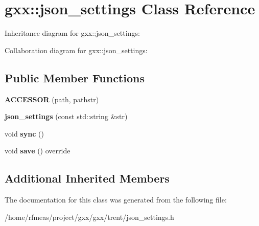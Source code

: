 \hypertarget{classgxx_1_1json__settings}{}\section{gxx\+:\+:json\+\_\+settings Class Reference}
\label{classgxx_1_1json__settings}


Inheritance diagram for gxx\+:\+:json\+\_\+settings\+:


Collaboration diagram for gxx\+:\+:json\+\_\+settings\+:
\subsection*{Public Member Functions}
\begin{DoxyCompactItemize}
\item 
{\bfseries A\+C\+C\+E\+S\+S\+OR} (path, pathstr)\hypertarget{classgxx_1_1json__settings_a6185e6ffd28a9571a7ebbb6b1ebb414d}{}\label{classgxx_1_1json__settings_a6185e6ffd28a9571a7ebbb6b1ebb414d}

\item 
{\bfseries json\+\_\+settings} (const std\+::string \&str)\hypertarget{classgxx_1_1json__settings_a81102ad9328f3b7b81cc634af1f8f44a}{}\label{classgxx_1_1json__settings_a81102ad9328f3b7b81cc634af1f8f44a}

\item 
void {\bfseries sync} ()\hypertarget{classgxx_1_1json__settings_ae5f77725abf4eba9ef8fa099b03c1c6a}{}\label{classgxx_1_1json__settings_ae5f77725abf4eba9ef8fa099b03c1c6a}

\item 
void {\bfseries save} () override\hypertarget{classgxx_1_1json__settings_a14f1136137ea11018fa022eaf43b4802}{}\label{classgxx_1_1json__settings_a14f1136137ea11018fa022eaf43b4802}

\end{DoxyCompactItemize}
\subsection*{Additional Inherited Members}


The documentation for this class was generated from the following file\+:\begin{DoxyCompactItemize}
\item 
/home/rfmeas/project/gxx/gxx/trent/json\+\_\+settings.\+h\end{DoxyCompactItemize}
